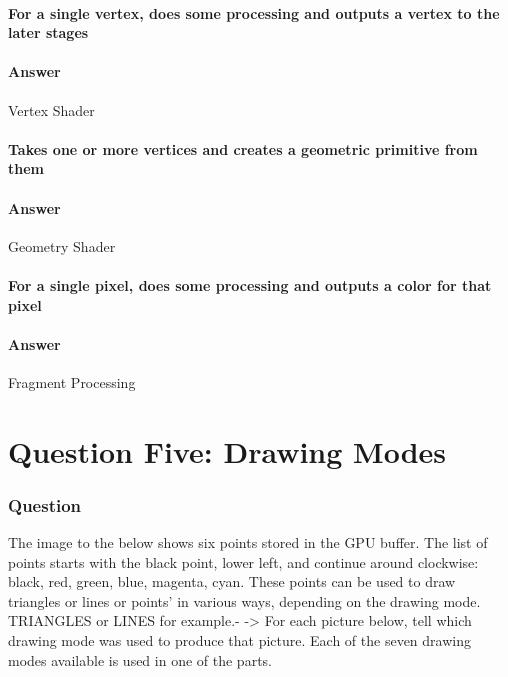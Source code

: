 \documentclass{report}
\begin{document}
\subsection{ For a single vertex, does some processing and outputs a vertex to the later stages}
\subsection{Answer}
Vertex Shader
\subsection{ Takes one or more vertices and creates a geometric primitive from them}
\subsection{Answer}
Geometry Shader
\subsection{ For a single pixel, does some processing and outputs a color for that pixel}
\subsection{Answer}
Fragment Processing
\part{Question Five: Drawing Modes}
\section{Question}
The image to the below shows six points stored in the GPU buffer. The list of points starts with the black point, lower left, and continue around clockwise: black, red, green, blue, magenta, cyan. These points can be used to draw triangles or lines or points' in various ways, depending on the drawing mode. TRIANGLES or LINES for example.- -> For each picture below, tell which drawing mode was used to produce that picture. Each of the seven drawing modes available is used in one of the parts.
\end{document}
